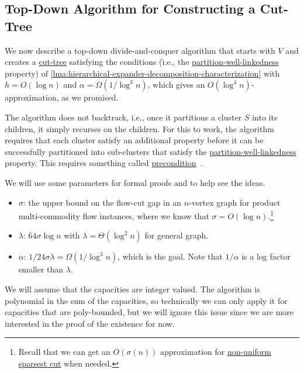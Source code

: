 \subsection{Top-Down Algorithm for Constructing a Cut-Tree}
We now describe a top-down divide-and-conquer algorithm that starts with \(V\) and creates a \hyperref[def:cut-tree]{cut-tree} satisfying the conditions (i.e., the \hyperref[def:partition-and-boundary-well-linked]{partition-well-linkedness} property) of \autoref{lma:hierarchical-expander-decomposition-characterization} with \(h = O(\log n)\) and \(\alpha = \Omega (1 / \log ^3 n)\), which gives an \(O(\log ^4 n)\)-approximation, as we promised.

The algorithm does not backtrack, i.e., once it partitions a cluster \(S\) into its children, it simply recurses on the children. For this to work, the algorithm requires that each cluster satisfy an additional property before it can be successfully partitioned into sub-clusters that satisfy the \hyperref[def:partition-and-boundary-well-linked]{partition-well-linkedness} property. This requires something called \hyperref[def:precondition]{precondition}~\cite{bienkowski2003practical}.

\begin{notation}[Parameter]
	We will use some parameters for formal proofs and to help see the ideas.
	\begin{itemize}
		\item \(\sigma \): the upper bound on the flow-cut gap in an \(n\)-vertex graph for product multi-commodity flow instances, where we know that \(\sigma = O(\log n)\).\footnote{Recall that we can get an \(O(\sigma (n))\) approximation for \hyperref[prb:non-uniform-sparsest-cut]{non-uniform sparsest cut} when needed.}
		\item \(\lambda \): \(64 \sigma \log n\) with \(\lambda = \Theta (\log ^2 n)\) for general graph.
		\item \(\alpha \): \(1 / 24 \sigma \lambda = \Omega (1 / \log ^3 n)\), which is the goal. Note that \(1 / \alpha \) is a log factor smaller than \(\lambda \).
	\end{itemize}
\end{notation}

We will assume that the capacities are integer valued. The algorithm is polynomial in the sum of the capacities, so technically we can only apply it for capacities that are poly-bounded, but we will ignore this issue since we are more interested in the proof of the existence for now.

